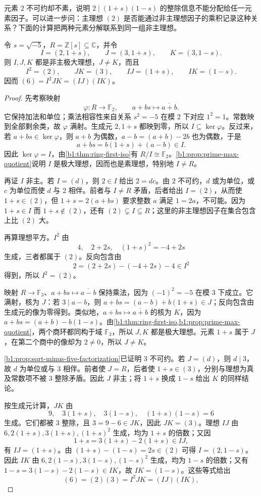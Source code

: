 元素 \(2\) 不可约却不素，说明 \(2\mid(1+s)(1-s)\) 的整除信息不能分配给任一元素因子。可以进一步问：主理想 \((2)\) 是否能通过非主理想因子的乘积记录这种关系？下面的计算把两种元素分解联系到同一组非主理想。

\begin{proposition}\label{b1:prop:sqrt-minus-five-ideal-factorization}
	令 \(s=\sqrt{-5}\)，\(R=\mathbb Z[s]\subseteq\mathbb C\)，并令
	\[
		I=(2,1+s),\qquad J=(3,1+s),\qquad K=(3,1-s).
	\]
	则 \(I,J,K\) 都是非主极大理想，\(J\ne K\)，而且
	\[
		I^2=(2),\qquad JK=(3),\qquad IJ=(1+s),\qquad IK=(1-s).
	\]
	因而 \((6)=I^2JK=(IJ)(IK)\)。
\end{proposition}
\begin{proof}
	先考察映射
	\[
		\varphi:R\longrightarrow\mathbb F_2,\qquad a+bs\longmapsto\overline{a+b}.
	\]
	它保持加法和单位；乘法相容性来自关系 \(s^2=-5\) 在模 \(2\) 下对应 \(1^2=1\)。常数映到全部剩余类，故 \(\varphi\) 满射。生成元 \(2,1+s\) 都映到零，所以 \(I\subseteq\ker\varphi\)。反过来，若 \(a+bs\in\ker\varphi\)，则 \(a+b\) 为偶数，\(a-b=(a+b)-2b\) 也为偶数，于是
	\[
		a+bs=b(1+s)+(a-b)\in I.
	\]
	因此 \(\ker\varphi=I\)，由\cref{b1:thm:ring-first-iso}有 \(R/I\cong\mathbb F_2\)。\cref{b1:prop:prime-max-quotient}说明 \(I\) 是极大理想，因而也是素理想，特别地 \(I\ne R\)。

	再证 \(I\) 非主。若 \(I=(d)\)，则 \(2\in I\) 给出 \(2=dc\)。由 \(2\) 不可约，\(d\) 或为单位，或 \(c\) 为单位而使 \(d\) 与 \(2\) 相伴。前者与 \(I\ne R\) 矛盾，后者给出 \(I=(2)\)，从而使 \(1+s\in(2)\)，但 \(1+s=2(a+bs)\) 要求整数 \(a\) 满足 \(1=2a\)，不可能。因为 \(1+s\in I\) 而 \(1+s\notin(2)\)，还有 \((2)\subsetneq I\subsetneq R\)；这里的非主理想因子在集合包含上比 \((2)\) 大。

	再算理想平方。\(I^2\) 由
	\[
		4,\quad 2+2s,\quad (1+s)^2=-4+2s
	\]
	生成，三者都属于 \((2)\)。反向包含由
	\[
		2=(2+2s)-(-4+2s)-4\in I^2
	\]
	得到，所以 \(I^2=(2)\)。

	映射 \(R\rightarrow\mathbb F_3\)、\(a+bs\mapsto\overline{a-b}\) 保持乘法，因为 \((-1)^2=-5\) 在模 \(3\) 下成立。它满射，核为 \(J\)：若 \(3\mid a-b\)，则 \(a+bs=(a-b)+b(1+s)\in J\)；反向包含由生成元的像为零得到。类似地，\(a+bs\mapsto\overline{a+b}\) 的核为 \(K\)，因为 \(a+bs=(a+b)-b(1-s)\)。由\cref{b1:thm:ring-first-iso,b1:prop:prime-max-quotient}，两个商环都同构于域 \(\mathbb F_3\)，所以 \(J,K\) 都是极大理想。元素 \(1+s\) 属于 \(J\)，在第二个商中的像却为 \(2\ne0\)，所以 \(J\ne K\)。

	\cref{b1:prop:sqrt-minus-five-factorization}已证明 \(3\) 不可约。若 \(J=(d)\)，则 \(d\mid3\)，故 \(d\) 为单位或与 \(3\) 相伴。前者使 \(J=R\)，后者使 \(1+s\in(3)\)，分别与理想为真及常数项不被 \(3\) 整除矛盾。因此 \(J\) 非主；将 \(1+s\) 换成 \(1-s\) 给出 \(K\) 的同样结论。

	按生成元计算，\(JK\) 由
	\[
		9,\quad3(1+s),\quad3(1-s),\quad(1+s)(1-s)=6
	\]
	生成。它们都被 \(3\) 整除，且 \(3=9-6\in JK\)，因此 \(JK=(3)\)。理想 \(IJ\) 由 \(6,2(1+s),3(1+s),(1+s)^2\) 生成，均为 \(1+s\) 的倍数；又因
	\[
		1+s=3(1+s)-2(1+s)\in IJ,
	\]
	有 \(IJ=(1+s)\)。由 \((1+s)-(1-s)=2s\in(2)\) 可得 \(I=(2,1-s)\)。因此 \(IK\) 由 \(6,2(1-s),3(1-s),(1-s)^2\) 生成，均为 \(1-s\) 的倍数；又有 \(1-s=3(1-s)-2(1-s)\in IK\)，故 \(IK=(1-s)\)。这些等式给出
	\[
		(6)=(2)(3)=I^2JK=(IJ)(IK),
	\]
\end{proof}

